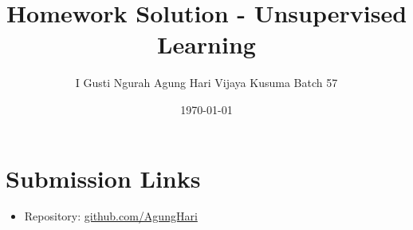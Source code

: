 \documentclass[12pt]{article}
\title{Homework Solution - Unsupervised Learning}
\author{I Gusti Ngurah Agung Hari Vijaya Kusuma Batch 57}
\date{\today}
\begin{document}
\maketitle

\section*{Submission Links}
\begin{itemize}
  \item Repository: \href{https://github.com/AgungHari/Rakamin_HW_UnsupervisedLearning}{github.com/AgungHari}
\end{itemize}






\end{document}
